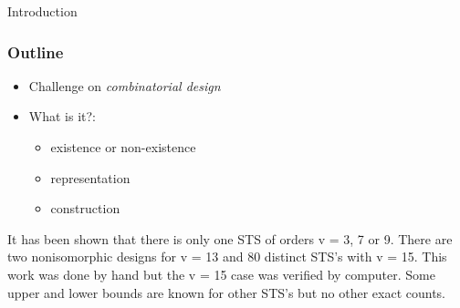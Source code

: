 	\begin{frame}[plain,c]
		\begin{center}
			\huge Introduction
		\end{center}
	\end{frame}


	\begin{frame}
		\frametitle{Outline}
		\begin{itemize}
			\item Challenge on \textit{combinatorial design}%
			\item What is it?:
			\begin{itemize}
				\item existence or non-existence
				\item representation
				\item construction
			\end{itemize}
		\end{itemize}
	\end{frame}

	
	It has been shown that there is only one STS of orders v = 3, 7 or 9. There are two nonisomorphic designs for v = 13 and 80 distinct STS's with v = 15. This work was done by hand but the v = 15 case was verified by computer. Some upper and lower bounds are known for other STS's but no other exact counts.
	
